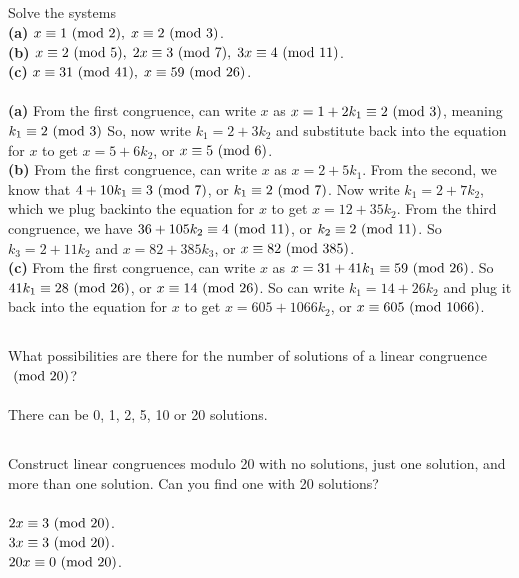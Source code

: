 \documentclass{article}
\begin{document}
\subsection{}
Solve the systems\\
\textbf{(a)} $x \equiv 1 \ (\mathrm{mod}\ 2), \; x \equiv 2 \ (\mathrm{mod}\ 3)$.\\
\textbf{(b)}
$x \equiv 2 \ (\mathrm{mod}\ 5), \; 2x \equiv 3 \ (\mathrm{mod}\ 7), \; 3x \equiv 4 \ (\mathrm{mod}\ 11)$.\\
\textbf{(c)}
$x \equiv 31 \ (\mathrm{mod}\ 41), \; x \equiv 59 \ (\mathrm{mod}\ 26)$.\\~\\
\textbf{(a)}
From the first congruence, can write
$x$ as $x = 1 + 2k_1 \equiv 2 \ (\mathrm{mod}\ 3)$, meaning $k_1 \equiv 2 \ (\mathrm{mod}\ 3)$
So, now write $k_1 = 2 + 3k_2$ and substitute back into the equation
for $x$ to get $x = 5 + 6k_2$, or $x \equiv 5 \ (\mathrm{mod}\ 6)$.\\
\textbf{(b)}
From the first congruence, can write $x$ as $x = 2 + 5k_1$.
From the second, we know that
$4 + 10k_1 \equiv 3 \ (\mathrm{mod}\ 7)$, or $k_1 \equiv 2 \ (\mathrm{mod}\ 7)$.
Now write $k_1 = 2 + 7k_2$, which we plug backinto the equation for $x$
to get $x = 12 + 35k_2$.
From the third congruence, we have
$36 + 105k_2 \equiv 4 \ (\mathrm{mod}\ 11)$, or $k_2 \equiv 2 \ (\mathrm{mod}\ 11)$.
So $k_3 = 2 + 11k_2$ and $x = 82 + 385k_3$, or $x \equiv 82 \ (\mathrm{mod}\ 385)$.\\
\textbf{(c)}
From the first congruence, can write $x$ as
$x = 31 + 41k_1 \equiv 59 \ (\mathrm{mod}\ 26)$.
So $41k_1 \equiv 28 \ (\mathrm{mod}\ 26)$, or $x \equiv 14 \ (\mathrm{mod}\ 26)$.
So can write $k_1 = 14 + 26k_2$ and plug it back into the equation for $x$
to get $x = 605 + 1066k_2$, or $x \equiv 605 \ (\mathrm{mod}\ 1066)$.

\subsection{}
What possibilities are there for the number of solutions of a linear
congruence $\ (\mathrm{mod}\ 20)$?\\~\\
There can be 0, 1, 2, 5, 10 or 20 solutions.

\subsection{}
Construct linear congruences modulo 20 with no solutions, just one solution,
and more than one solution. Can you find one with 20 solutions?\\~\\
$2x \equiv 3 \ (\mathrm{mod}\ 20)$.\\
$3x \equiv 3 \ (\mathrm{mod}\ 20)$.\\
$20x \equiv 0 \ (\mathrm{mod}\ 20)$.
\end{document}
